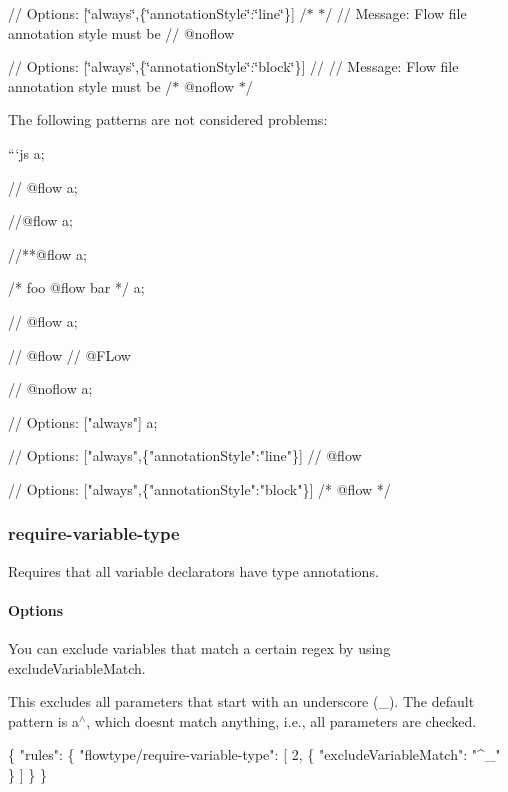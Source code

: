 // Options\+: \mbox{[}\char`\"{}always\char`\"{},\{\char`\"{}annotation\+Style\char`\"{}\+:\char`\"{}line\char`\"{}\}\mbox{]} /$\ast$  $\ast$/ // Message\+: Flow file annotation style must be {\ttfamily // @noflow}

// Options\+: \mbox{[}\char`\"{}always\char`\"{},\{\char`\"{}annotation\+Style\char`\"{}\+:\char`\"{}block\char`\"{}\}\mbox{]} //  // Message\+: Flow file annotation style must be {\ttfamily /$\ast$ @noflow $\ast$/} 
\begin{DoxyCode}
The following patterns are not considered problems:

```js
a;

// @flow
a;

//@flow
a;

//**@flow
a;

/* foo @flow bar */
a;



// @flow
a;

// @flow
// @FLow

// @noflow
a;

// Options: ["always"]
a;

// Options: ["always",\{"annotationStyle":"line"\}]
// @flow

// Options: ["always",\{"annotationStyle":"block"\}]
/* @flow */
\end{DoxyCode}


\label{_eslint-plugin-flowtype-rules-require-variable-type}%
 \subsubsection*{{\ttfamily require-\/variable-\/type}}

Requires that all variable declarators have type annotations.

\label{_eslint-plugin-flowtype-rules-require-variable-type-options}%
 \paragraph*{Options}

You can exclude variables that match a certain regex by using {\ttfamily exclude\+Variable\+Match}.

This excludes all parameters that start with an underscore ({\ttfamily \+\_\+}). The default pattern is {\ttfamily a$^\wedge$}, which doesn\textquotesingle{}t match anything, i.\+e., all parameters are checked.


\begin{DoxyCode}
\{
    "rules": \{
        "flowtype/require-variable-type": [
            2,
            \{
              "excludeVariableMatch": "^\_"
            \}
        ]
    \}
\}
\end{DoxyCode}


